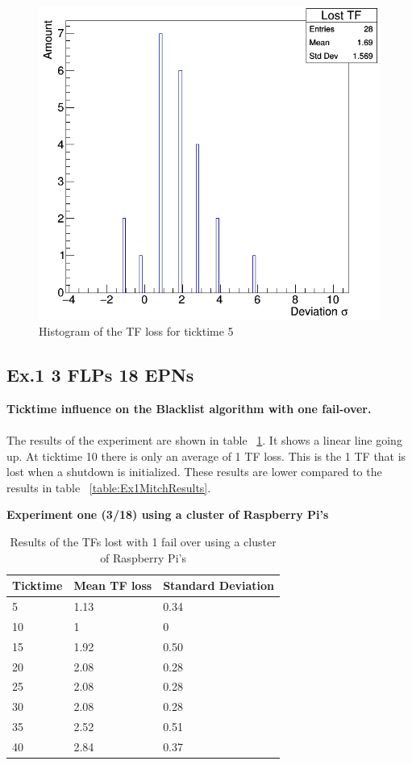 \begin{figure}
	\centering
	\includegraphics[scale=0.5]{./graphics/ex3_histogram.png}
	\caption{Histogram of the TF loss for ticktime 5}
	\label{fig:Ex3Histogram}
\end{figure}

\newpage

\subsection*{Ex.1 3 FLPs 18 EPNs}
\textbf{Ticktime influence on the Blacklist algorithm with one fail-over.}
\\~\\
The results of the experiment are shown in table ~\ref{table:Ex1318Results}. It shows a linear line going up. At ticktime 10 there is only an average of 1 TF loss. This is the 1 TF that is lost when a shutdown is initialized. These results are lower compared to the results in table ~\ref{table:Ex1MitchResults}.

\begin{table}[h!]
\caption*{\textbf{Experiment one (3/18) using a cluster of Raspberry Pi's}}
\begin{tabular}{| l | l | l |}
\hline
Ticktime & Mean TF loss & Standard Deviation \\ \hline
5 & 1.13 & 0.34 \\ \hline
10 & 1 & 0 \\ \hline
15 & 1.92 & 0.50 \\ \hline
20 & 2.08 & 0.28 \\ \hline
25 & 2.08 & 0.28 \\ \hline
30 & 2.08 & 0.28 \\ \hline
35 & 2.52 & 0.51 \\ \hline
40 & 2.84 & 0.37 \\ \hline
\end{tabular}
\caption{Results of the TFs lost with 1 fail over using a cluster of Raspberry Pi's}
\label{table:Ex1318Results}
\end{table}

